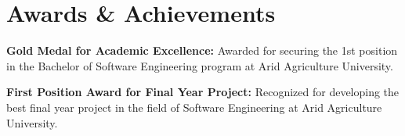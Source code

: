 \section{Awards \& Achievements}
\vspace{2pt}
\resumeSubHeadingListStart
\small{\item{
              \textbf{Gold Medal for Academic Excellence:}{ Awarded for securing the 1st position in the Bachelor of Software Engineering program at Arid Agriculture University.} \\ \vspace{3pt}

              \textbf{First Position Award for Final Year Project:}{ Recognized for developing the best final year project in the field of Software Engineering at Arid Agriculture University.}
        }}
\resumeSubHeadingListEnd
